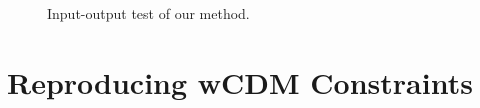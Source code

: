\documentclass[useAMS,usenatbib]{mnras}
\begin{document}
\begin{figure}
   \caption{\label{fig_IO}
   Input-output test of our method.
   }
\end{figure}



\section{Reproducing wCDM Constraints}
\end{document}
